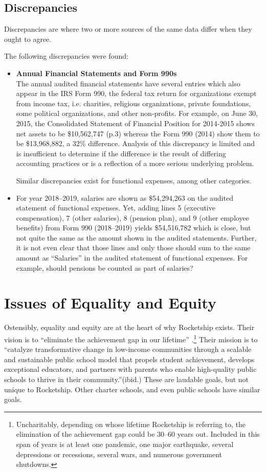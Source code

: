 \subsection{Discrepancies}%
\label{sec:discrepancies}\indent%

Discrepancies are where two or more sources of the same data differ when they ought to agree.

The following discrepancies were found:
\begin{itemize}
  \item \textbf{Annual Financial Statements and Form 990s}\\
  The annual audited financial statements have several entries which also appear in the IRS Form 990, the federal tax return for organizations exempt from income tax, i.e. charities, religious organizations, private foundations, some political organizations, and other non-profits. For example, on June 30, 2015, the Consolidated Statement of Financial Position for 2014-2015 shows net assets to be \$10,562,747 (p.3) whereas the Form 990 (2014) show them to be \$13,968,882, a 32\% difference. Analysis of this discrepancy is limited and is insufficient to determine if the difference is the result of differing accounting practices or is a reflection of a more serious underlying problem.

  Similar discrepancies exist for functional expenses, among other categories.
 \item For year 2018–2019, salaries are shown as \$54,294,263 on the audited statement of functional expenses. Yet, adding lines 5 (executive compensation), 7 (other salaries), 8 (pension plan), and 9 (other employee benefits) from Form 990 (2018–2019) yields \$54,516,782 which is close, but not quite the same as the amount shown in the audited statements. Further, it is not even clear that those lines and only those should sum to the same amount as ``Salaries'' in the audited statement of functional expenses.  For example, should pensions be counted as part of salaries? 
\end{itemize}

\section{Issues of Equality and Equity}%
\label{sec:issues_equality_equity}\indent%

Ostensibly, equality and equity are at the heart of why Rocketship exists. Their vision is to ``eliminate the achievement gap in our lifetime'' \parencite{RSE2017}.\footnote{Uncharitably, depending on whose lifetime Rocketship is referring to, the elimination of the achievement gap could be 30–60 years out. Included in this span of years is at least one pandemic, one major earthquake, several depressions or recessions, several wars, and numerous government shutdowns.} Their mission is to ``catalyze transformative change in low-income communities through a scalable and sustainable public school model that propels student achievement, develops exceptional educators, and partners with parents who enable high-quality public schools to thrive in their community.''(ibid.) These are laudable goals, but not unique to Rocketship. Other charter schools, and even public schools have similar goals.

